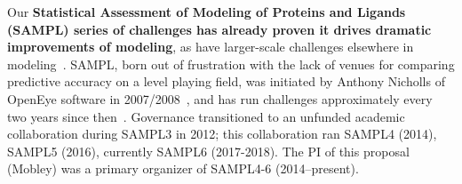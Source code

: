 \documentclass[11pt]{article}
\begin{document}
Our {\bf Statistical Assessment of Modeling of Proteins and Ligands (SAMPL) series of challenges has already proven it drives dramatic improvements of modeling}, as have larger-scale challenges elsewhere in modeling~\cite{Saez-Rodriguez:2016:NatRevGenet}.
SAMPL, born out of frustration with the lack of venues for comparing predictive accuracy on a level playing field, was initiated by Anthony Nicholls of OpenEye software in 2007/2008~\cite{nicholls_predicting_2008}, and has run challenges approximately every two years since then~\cite{nicholls_samp1_2009, mobley_predictions_2009, geballe_sampl2_2010, geballe_sampl3_2012, mobley_blind_2014-1, muddana_sampl4_2014, Bannan:2016:JComputAidedMolDes, yin_overview_2016}.
Governance transitioned to an unfunded academic collaboration during SAMPL3 in 2012; this collaboration ran SAMPL4 (2014), SAMPL5 (2016), currently SAMPL6 (2017-2018). 
The PI of this proposal (Mobley) was a primary organizer of SAMPL4-6 (2014--present).
\end{document}
